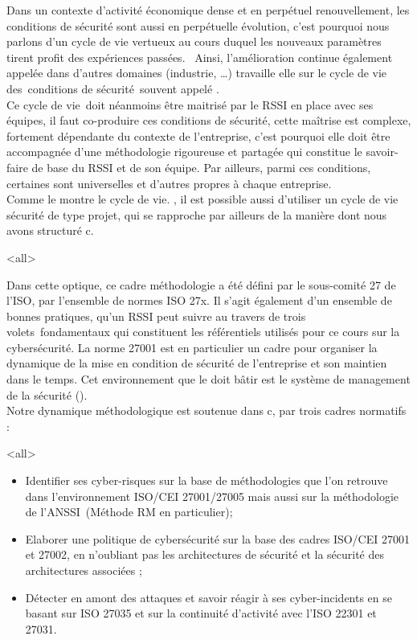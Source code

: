 Dans un contexte d'activité économique dense et en perpétuel renouvellement, les conditions de sécurité sont aussi en perpétuelle évolution, c’est pourquoi nous parlons d'un cycle de vie vertueux au cours duquel les nouveaux paramètres tirent profit des expériences passées.  Ainsi, l’amélioration continue également appelée  dans d’autres domaines (industrie, …) travaille elle sur le cycle de vie des conditions de sécurité souvent appelé .\\
Ce cycle de vie doit néanmoins être maitrisé par le RSSI en place avec ses équipes, il faut co-produire ces conditions de sécurité, cette maîtrise est complexe, fortement dépendante du contexte de l'entreprise, c’est pourquoi elle doit être accompagnée d'une méthodologie rigoureuse et partagée qui constitue le savoir-faire de base du RSSI et de son équipe. Par ailleurs, parmi ces conditions, certaines sont universelles et d’autres propres à chaque entreprise. \\ Comme le montre le cycle de vie. , il est possible aussi d’utiliser un cycle de vie sécurité de type projet, qui se rapproche par ailleurs de la manière dont nous avons structuré c\edoc. 

\mode<all>{}


Dans cette optique, ce cadre méthodologie a été défini par le sous-comité 27 de l'ISO, par l'ensemble de normes ISO 27x. Il s’agit également d'un ensemble de bonnes pratiques, qu'un RSSI peut suivre au travers de trois volets fondamentaux qui constituent les référentiels utilisés pour ce cours sur la cybersécurité. La norme 27001 est en particulier un cadre pour organiser la dynamique de la mise en condition de sécurité de l’entreprise et son maintien dans le temps. Cet environnement que le  doit bâtir est le système de management de la sécurité ().\\
Notre dynamique méthodologique est soutenue dans  c\edoc, par trois cadres normatifs : 
 
\mode<all>{
{
\begin{itemize}
\item Identifier ses cyber-risques sur la base de méthodologies que l’on retrouve dans l’environnement ISO/CEI 27001/27005 mais aussi sur la méthodologie  de l’ANSSI (Méthode  RM en particulier); 
\item Elaborer une politique de cybersécurité sur la base des cadres ISO/CEI 27001 et 27002, en n’oubliant pas les architectures de sécurité et la sécurité des architectures associées ; 
\item Détecter en amont des attaques et savoir réagir à ses cyber-incidents en se basant sur ISO 27035 et sur la continuité d’activité avec l'ISO 22301 et 27031.
\end{itemize}
}} %


